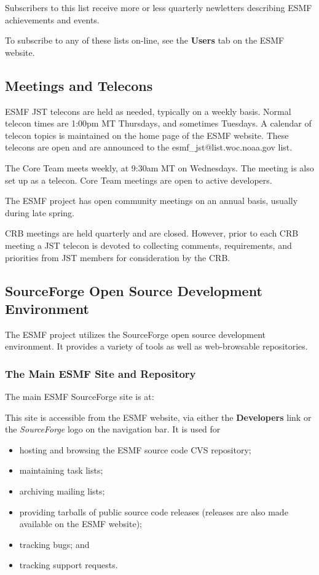 Subscribers to this list receive more or less quarterly newletters
describing ESMF achievements and events.

To subscribe to any of these lists on-line, see the {\bf Users} 
tab on the ESMF website.

\subsection{Meetings and Telecons}

ESMF JST telecons are held as needed, typically on a weekly basis.
Normal telecon times are 1:00pm MT Thursdays, and sometimes Tuesdays.
A calendar of telecon topics is maintained on the home page of 
the ESMF website.  These telecons are open and are announced to 
the esmf\_jst@list.woc.noaa.gov list.

The Core Team meets weekly, at 9:30am MT on Wednesdays.  The
meeting is also set up as a telecon.  Core Team meetings are open
to active developers.

The ESMF project has open community meetings on an annual basis,
usually during late spring.  

CRB meetings are held quarterly and are closed.  However, prior 
to each CRB meeting a JST telecon is devoted to collecting comments,
requirements, and priorities from JST members for consideration by
the CRB.  

\subsection{SourceForge Open Source Development Environment}
The ESMF project utilizes the SourceForge open source development
environment.  It provides a variety of tools as well as web-browsable
repositories.

\subsubsection{The Main ESMF Site and Repository}

The main ESMF SourceForge site is at:
\begin{center}
\end{center}

This site is accessible from the ESMF website,
via either the {\bf Developers} link or the {\it SourceForge}
logo on the navigation bar.  It is used for
\begin{itemize}
\item hosting and browsing the ESMF source code CVS repository; 
\item maintaining task lists;
\item archiving mailing lists;
\item providing tarballs of public source code releases (releases
      are also made available on the ESMF website);
\item tracking bugs; and 
\item tracking support requests.
\end{itemize}

